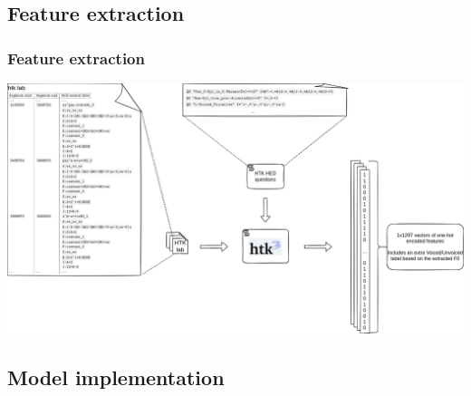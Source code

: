 \documentclass[a4paper,9pt]{beamer}
\theoremstyle{mytheoremstyle}
\begin{document}
\subsection{Feature extraction}

\begin{frame}
\frametitle{Feature extraction}
\begin{center}
  \includegraphics[width=\textwidth]{res/dataset_feature_extraction}
\end{center}
\end{frame}



\subsection{Model implementation}
\end{document}
